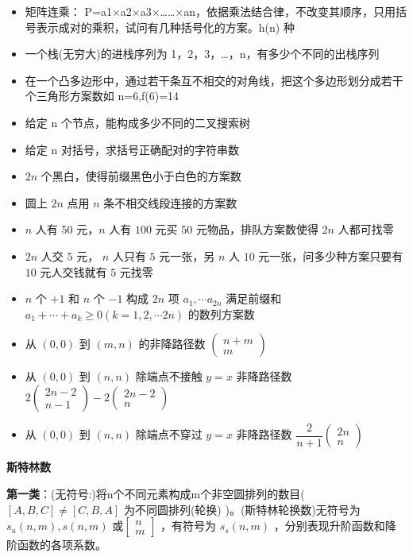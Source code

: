 \documentclass[twocolumn,10pt]{ctexart}
\makeatletter
\newcommand{\hfive}[1]{\par\addvspace{6pt}\@afterindentfalse
  {\noindent\bfseries\normalsize #1}\par\nobreak\vspace{2pt}}
\makeatother
\begin{document}
\begin{itemize}
\item 矩阵连乘： P=a1×a2×a3×……×an，依据乘法结合律，不改变其顺序，只用括号表示成对的乘积，试问有几种括号化的方案。h(n) 种
\item 一个栈(无穷大)的进栈序列为 1，2，3，…，n，有多少个不同的出栈序列
\item 在一个凸多边形中，通过若干条互不相交的对角线，把这个多边形划分成若干个三角形方案数如 n=6,f(6)=14
\item 给定 n 个节点，能构成多少不同的二叉搜索树
\item 给定 n 对括号，求括号正确配对的字符串数
\item $2n$ 个黑白，使得前缀黑色小于白色的方案数
\item 圆上 $2n$ 点用 $n$ 条不相交线段连接的方案数
\item $n$ 人有 $50$ 元，$n$ 人有 $100$ 元买 $50$ 元物品，排队方案数使得 $2n$ 人都可找零
\item $2n$ 人交 $5$ 元， $n$ 人只有 $5$ 元一张，另 $n$ 人 $10$ 元一张，问多少种方案只要有 $10$ 元人交钱就有 $5$ 元找零
\item $n$ 个 $+1$ 和 $n$ 个 $-1$ 构成 $2n$ 项 $a_1,\cdots a_{2n}$ 满足前缀和 $a_1+\cdots+a_k\ge0(k=1,\allowbreak{}2,\allowbreak{}\cdots2 n)$ 的数列方案数
\item 从 $(0,0)$ 到 $(m,n)$ 的非降路径数 $\begin{pmatrix}n+m\\m\end{pmatrix}$
\item 从 $(0,0)$ 到 $(n,n)$ 除端点不接触 $y=x$ 非降路径数 $2\begin{pmatrix}2n-2\\n-1\end{pmatrix}-2\begin{pmatrix}2n-2\\n\end{pmatrix}$
\item 从 $(0,0)$ 到 $(n,n)$ 除端点不穿过 $y=x$ 非降路径数 $\dfrac2{n+1}\begin{pmatrix}2n\\n\end{pmatrix}$
\end{itemize}

\hfive{斯特林数}

\textbf{第一类}：(无符号:)将n个不同元素构成m个非空圆排列的数目( $[A,B,C]\neq[C,B,A]$ 为不同圆排列(轮换) )。(斯特林轮换数)无符号为 $s_u(n,m),s(n,m)$ 或$\left[\begin{matrix}n\\m\end{matrix}\right]$ ，有符号为 $s_s(n,m)$ ，分别表现升阶函数和降阶函数的各项系数。
\end{document}
